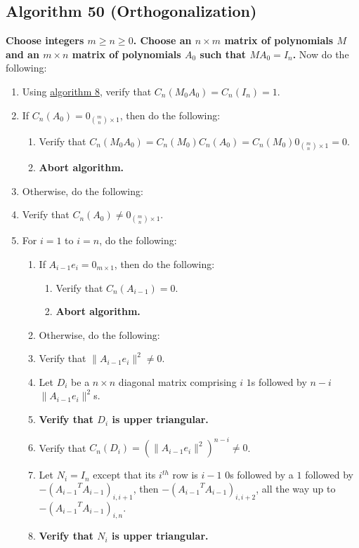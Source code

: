 \documentclass[twocolumn]{article}
\begin{document}
		\subsection{Algorithm 50 (Orthogonalization)}\label{sec:algorithm 50}
			\textbf{Choose integers $m\ge n\ge 0$. Choose an $n\times m$ matrix of polynomials $M$ and an $m\times n$ matrix of polynomials $A_0$ such that $MA_0=I_n$.} Now do the following:
			\begin{enumerate}
				\item Using \hyperref[sec:algorithm 8]{algorithm 8}, verify that $C_n(M_0A_0)=C_n(I_n)=1$.
				\item If $C_n(A_0)=0_{\binom{m}{n}\times 1}$, then do the following:
				\begin{enumerate}
					\item Verify that $C_n(M_0A_0)=C_n(M_0)C_n(A_0)=C_n(M_0)0_{\binom{m}{n}\times 1}=0$.
					\item \textbf{Abort algorithm.}
				\end{enumerate}
				\item Otherwise, do the following:
				\item Verify that $C_n(A_0)\ne0_{\binom{m}{n}\times 1}$.
				\item For $i=1$ to $i=n$, do the following:
				\begin{enumerate}
					\item If $A_{i-1}e_i=0_{m\times 1}$, then do the following:
					\begin{enumerate}
						\item Verify that $C_n(A_{i-1})=0$.
						\item \textbf{Abort algorithm.}
					\end{enumerate}
					\item Otherwise, do the following:
					\item Verify that $\lVert A_{i-1}e_i\rVert^2\ne 0$.
					\item Let $D_i$ be a $n\times n$ diagonal matrix comprising $i$ $1$s followed by $n-i$ $\lVert A_{i-1}e_i\rVert^2$s.
					\item \textbf{Verify that $D_i$ is upper triangular.}
					\item Verify that $C_n(D_i)=(\lVert A_{i-1}e_i\rVert^2)^{n-i}\ne 0$.
					\item Let $N_i=I_n$ except that its $i^{th}$ row is $i-1$ $0$s followed by a $1$ followed by $-({A_{i-1}}^TA_{i-1})_{i,i+1}$, then $-({A_{i-1}}^TA_{i-1})_{i,i+2}$, all the way up to $-({A_{i-1}}^TA_{i-1})_{i,n}$.
					\item \textbf{Verify that $N_i$ is upper triangular.}

\end{enumerate}
\end{enumerate}
\end{document}
